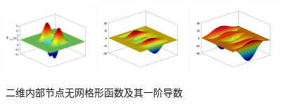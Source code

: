 \begin{figure}[H]
\begin{subcaptiongroup}
\end{subcaptiongroup}
\begin{subcaptiongroup}
    \includegraphics[width=0.3\textwidth]{figure/nomesh/QD41/5.png}
    \includegraphics[width=0.3\textwidth]{figure/nomesh/C41/5.png}
    \includegraphics[width=0.3\textwidth]{figure/nomesh/QT41/5.png}
\end{subcaptiongroup}
\caption{二维内部节点无网格形函数及其一阶导数}\label{gradient1}
\end{figure}
